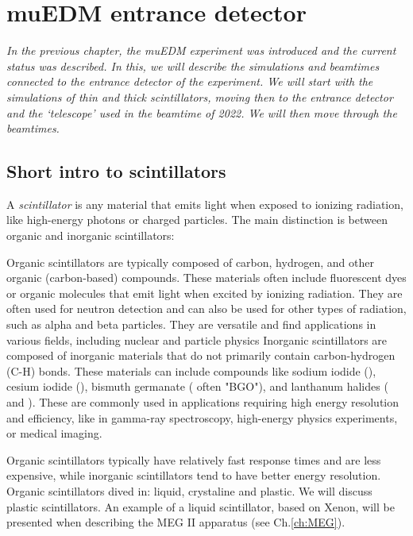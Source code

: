 \chapter{muEDM entrance detector}
\label{ch:muEDM:entrance}
\begin{refsection}

{\itshape
In the previous chapter, the muEDM experiment was introduced and the current status was described.
In this, we will describe the simulations and beamtimes connected to the entrance detector of the experiment. 
We will start with the \gf simulations of thin and thick scintillators, moving then to the entrance detector and the `telescope' used in the beamtime of 2022.
We will then move through the beamtimes.
}

\section{Short intro to scintillators}
\label{sec:muEDM:scintillators}
    A \textit{scintillator} is any material that emits light when exposed to ionizing radiation, like high-energy photons or charged particles.
    The main distinction is between organic and inorganic scintillators:
    \begin{outline}
        \1 Organic scintillators are typically composed of carbon, hydrogen, and other organic (carbon-based) compounds. These materials often include fluorescent dyes or organic molecules that emit light when excited by ionizing radiation.
        They are often used for neutron detection and can also be used for other types of radiation, such as alpha and beta particles. They are versatile and find applications in various fields, including nuclear and particle physics
        \1 Inorganic scintillators are composed of inorganic materials that do not primarily contain carbon-hydrogen (C-H) bonds. These materials can include compounds like sodium iodide (), cesium iodide (), bismuth germanate ( often "BGO"), and lanthanum halides ( and ).
        These are commonly used in applications requiring high energy resolution and efficiency, like in gamma-ray spectroscopy, high-energy physics experiments, or medical imaging.
    \end{outline}
    Organic scintillators typically have relatively fast response times and are less expensive, while inorganic scintillators tend to have better energy resolution.
    Organic scintillators dived in: liquid, crystaline and plastic.
    We will discuss plastic scintillators. 
    An example of a liquid scintillator, based on Xenon, will be presented when describing the MEG II apparatus (see Ch.\ref{ch:MEG}).


\end{refsection}
